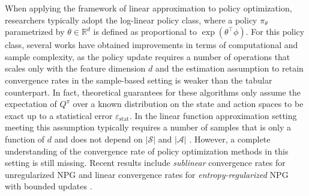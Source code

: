 \documentclass[a4paper,12pt]{article}
\numberwithin{theorem}{section}
\newcommand\A{\mathcal{A}}
\newcommand\R{\mathbb{R}}
\renewcommand\S{\mathcal{S}}
\newcommand\1{\mathbf{1}}
\begin{document}
When applying the framework of linear approximation to policy optimization, researchers typically adopt the log-linear policy class, where a policy $\pi_\theta$ parametrized by $\theta\in\R^d$ is defined as proportional to $\exp(\theta^\top\phi)$. For this policy class, several works have obtained improvements in terms of computational and sample complexity, as the policy update requires a number of operations that scales only with the feature dimension $d$ and the estimation assumption to retain convergence rates in the sample-based setting is weaker than the tabular counterpart. In fact, theoretical guarantees for these algorithms only assume the expectation of $Q^\pi$ over a known distribution on the state and action spaces to be exact up to a statistical error $\varepsilon_\text{stat}$. In the linear function approximation setting meeting this assumption typically requires a number of samples that is only a function of $d$ and does not depend on $|\S|$ and $|\A|$ \citep{bhandari2018finite}. However, a complete understanding of the convergence rate of policy optimization methods in this setting is still missing. Recent results include \emph{sublinear} convergence rates for unregularized NPG \citep{RN265, RN274, RN277, RN279} and linear convergence rates for \emph{entropy-regularized} NPG with bounded updates \citep{RN280}. 

\end{document}
